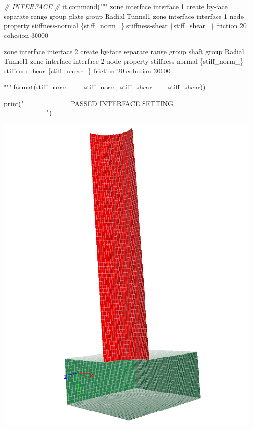 \documentclass[a4paper, nobind]{templates/ociamthesis}
\newenvironment{Shaded}{\begin{snugshade}}{\end{snugshade}}
\newcommand{\BuiltInTok}[1]{#1}
\newcommand{\CommentTok}[1]{\textcolor[rgb]{0.56,0.35,0.01}{\textit{#1}}}
\newcommand{\NormalTok}[1]{#1}
\newcommand{\OperatorTok}[1]{\textcolor[rgb]{0.81,0.36,0.00}{\textbf{#1}}}
\newcommand{\SpecialCharTok}[1]{\textcolor[rgb]{0.00,0.00,0.00}{#1}}
\newcommand{\StringTok}[1]{\textcolor[rgb]{0.31,0.60,0.02}{#1}}
\renewenvironment{Shaded}
{
  \vspace{10pt}%
  \begin{snugshade}%
}{%
  \end{snugshade}%
  \vspace{8pt}%
}
\begin{document}
\begin{Shaded}
\begin{Highlighting}[]
\CommentTok{\# INTERFACE \#}
\NormalTok{it.command(}\StringTok{"""}
\StringTok{zone interface \textquotesingle{}interface 1\textquotesingle{} create by{-}face separate range group \textquotesingle{}plate\textquotesingle{} group \textquotesingle{}Radial Tunnel1\textquotesingle{}}
\StringTok{zone interface \textquotesingle{}interface 1\textquotesingle{} node property stiffness{-}normal }\SpecialCharTok{\{stiff\_norm\_\}}\StringTok{ stiffness{-}shear }\SpecialCharTok{\{stiff\_shear\_\}}\StringTok{ friction 20 cohesion 30000}

\StringTok{zone interface \textquotesingle{}interface 2\textquotesingle{} create by{-}face separate range group \textquotesingle{}shaft\textquotesingle{} group \textquotesingle{}Radial Tunnel1\textquotesingle{}}
\StringTok{zone interface \textquotesingle{}interface 2\textquotesingle{} node property stiffness{-}normal }\SpecialCharTok{\{stiff\_norm\_\}}\StringTok{ stiffness{-}shear }\SpecialCharTok{\{stiff\_shear\_\}}\StringTok{ friction 20 cohesion 30000}

\StringTok{"""}\NormalTok{.}\BuiltInTok{format}\NormalTok{(stiff\_norm\_}\OperatorTok{=}\NormalTok{\_stiff\_norm, stiff\_shear\_}\OperatorTok{=}\NormalTok{\_stiff\_shear))}

\BuiltInTok{print}\NormalTok{(}\StringTok{"               ======== PASSED INTERFACE SETTING ========        ========"}\NormalTok{)}
\end{Highlighting}
\end{Shaded}

\includegraphics[width=1\linewidth]{myfigureeeeee/interface-both}
\end{document}
